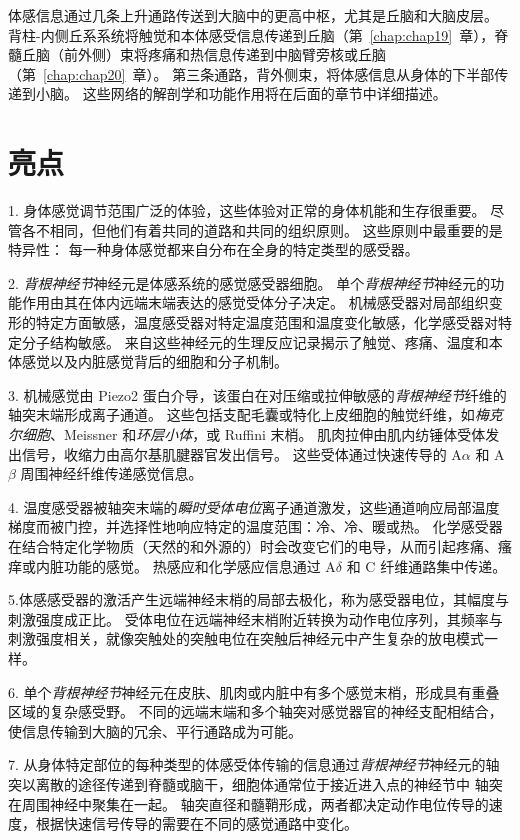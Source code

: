 体感信息通过几条上升通路传送到大脑中的更高中枢，尤其是丘脑和大脑皮层。
背柱-内侧丘系系统将触觉和本体感受信息传递到丘脑（第~\ref{chap:chap19}~章），脊髓丘脑（前外侧）束将疼痛和热信息传递到中脑臂旁核或丘脑（第~\ref{chap:chap20}~章）。
第三条通路，背外侧束，将体感信息从身体的下半部传递到小脑。
这些网络的解剖学和功能作用将在后面的章节中详细描述。




\section{亮点}


1. 身体感觉调节范围广泛的体验，这些体验对正常的身体机能和生存很重要。
尽管各不相同，但他们有着共同的道路和共同的组织原则。
这些原则中最重要的是特异性：
每一种身体感觉都来自分布在全身的特定类型的感受器。 


2. \textit{背根神经节}神经元是体感系统的感觉感受器细胞。
单个\textit{背根神经节}神经元的功能作用由其在体内远端末端表达的感觉受体分子决定。
机械感受器对局部组织变形的特定方面敏感，温度感受器对特定温度范围和温度变化敏感，化学感受器对特定分子结构敏感。
来自这些神经元的生理反应记录揭示了触觉、疼痛、温度和本体感觉以及内脏感觉背后的细胞和分子机制。 


3. 机械感觉由 Piezo2 蛋白介导，该蛋白在对压缩或拉伸敏感的\textit{背根神经节}纤维的轴突末端形成离子通道。
这些包括支配毛囊或特化上皮细胞的触觉纤维，如\textit{梅克尔细胞}、Meissner 和\textit{环层小体}，或 Ruffini 末梢。
肌肉拉伸由肌内纺锤体受体发出信号，收缩力由高尔基肌腱器官发出信号。
这些受体通过快速传导的 A$\alpha$ 和 A$\beta$ 周围神经纤维传递感觉信息。 


4. 温度感受器被轴突末端的\textit{瞬时受体电位}离子通道激发，这些通道响应局部温度梯度而被门控，并选择性地响应特定的温度范围：冷、冷、暖或热。
化学感受器在结合特定化学物质（天然的和外源的）时会改变它们的电导，从而引起疼痛、瘙痒或内脏功能的感觉。
热感应和化学感应信息通过 A$\delta$ 和 C 纤维通路集中传递。 


5.体感感受器的激活产生远端神经末梢的局部去极化，称为感受器电位，其幅度与刺激强度成正比。
受体电位在远端神经末梢附近转换为动作电位序列，其频率与刺激强度相关，就像突触处的突触电位在突触后神经元中产生复杂的放电模式一样。 


6. 单个\textit{背根神经节}神经元在皮肤、肌肉或内脏中有多个感觉末梢，形成具有重叠区域的复杂感受野。 
不同的远端末端和多个轴突对感觉器官的神经支配相结合，使信息传输到大脑的冗余、平行通路成为可能。 


7. 从身体特定部位的每种类型的体感受体传输的信息通过\textit{背根神经节}神经元的轴突以离散的途径传递到脊髓或脑干，细胞体通常位于接近进入点的神经节中 轴突在周围神经中聚集在一起。
轴突直径和髓鞘形成，两者都决定动作电位传导的速度，根据快速信号传导的需要在不同的感觉通路中变化。 


